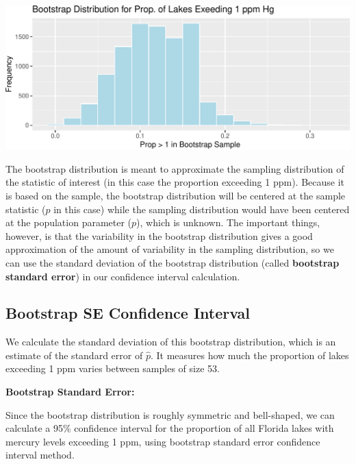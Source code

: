 \documentclass[
  letterpaper,
  DIV=11,
  numbers=noendperiod]{scrreprt}
\newenvironment{Shaded}{\begin{snugshade}}{\end{snugshade}}
\newcommand{\FunctionTok}[1]{\textcolor[rgb]{0.28,0.35,0.67}{#1}}
\newcommand{\NormalTok}[1]{\textcolor[rgb]{0.00,0.23,0.31}{#1}}
\newcommand{\OtherTok}[1]{\textcolor[rgb]{0.00,0.23,0.31}{#1}}
\newcommand{\SpecialCharTok}[1]{\textcolor[rgb]{0.37,0.37,0.37}{#1}}
\begin{document}
\includegraphics{Ch3_files/figure-pdf/unnamed-chunk-57-1.pdf}

The bootstrap distribution is meant to approximate the sampling
distribution of the statistic of interest (in this case the proportion
exceeding 1 ppm). Because it is based on the sample, the bootstrap
distribution will be centered at the sample statistic (\(\hat{p}\) in
this case) while the sampling distribution would have been centered at
the population parameter (\(p\)), which is unknown. The important
things, however, is that the variability in the bootstrap distribution
gives a good approximation of the amount of variability in the sampling
distribution, so we can use the standard deviation of the bootstrap
distribution (called \textbf{bootstrap standard error}) in our
confidence interval calculation.

\subsection{Bootstrap SE Confidence
Interval}\label{bootstrap-se-confidence-interval}

We calculate the standard deviation of this bootstrap distribution,
which is an estimate of the standard error of \(\hat{p}\). It measures
how much the proportion of lakes exceeding 1 ppm varies between samples
of size 53.

\textbf{Bootstrap Standard Error:}

\begin{Shaded}
\end{Shaded}

Since the bootstrap distribution is roughly symmetric and bell-shaped,
we can calculate a 95\% confidence interval for the proportion of all
Florida lakes with mercury levels exceeding 1 ppm, using bootstrap
standard error confidence interval method.
\end{document}
